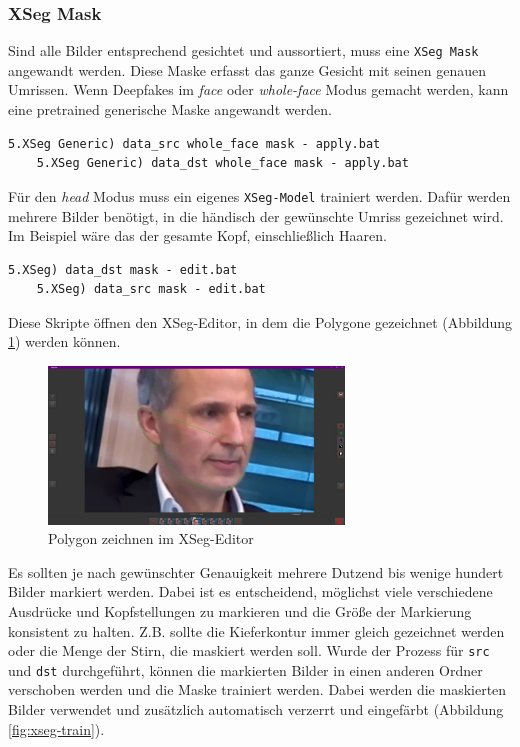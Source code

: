 \subsubsection{XSeg Mask}
Sind alle Bilder entsprechend gesichtet und aussortiert, muss eine \texttt{XSeg Mask} angewandt werden.
Diese Maske erfasst das ganze Gesicht mit seinen genauen Umrissen.
Wenn Deepfakes im \textit{face} oder \textit{whole-face} Modus gemacht werden, kann eine pretrained generische Maske angewandt werden.
\begin{lstlisting}[label={lst:extraction-5},numbers=none]
    5.XSeg Generic) data_src whole_face mask - apply.bat
    5.XSeg Generic) data_dst whole_face mask - apply.bat
\end{lstlisting}
Für den \textit{head} Modus muss ein eigenes \texttt{XSeg-Model} trainiert werden.
Dafür werden mehrere Bilder benötigt, in die händisch der gewünschte Umriss gezeichnet wird.
Im Beispiel wäre das der gesamte Kopf, einschließlich Haaren.
\begin{lstlisting}[numbers=none,label={lst:extraction-6}]
    5.XSeg) data_dst mask - edit.bat
    5.XSeg) data_src mask - edit.bat
\end{lstlisting}
Diese Skripte öffnen den XSeg-Editor, in dem die Polygone gezeichnet (Abbildung \ref{fig:xseg-editor-1}) werden können.
\begin{figure}
    \center
    \includegraphics[width=0.7\textwidth]{Bilder/DFL/XSegEditor-1-draw}
    \caption{Polygon zeichnen im XSeg-Editor}
    \label{fig:xseg-editor-1}
\end{figure}
Es sollten je nach gewünschter Genauigkeit mehrere Dutzend bis wenige hundert Bilder markiert werden.
Dabei ist es entscheidend, möglichst viele verschiedene Ausdrücke und Kopfstellungen zu markieren und die Größe der Markierung konsistent zu halten.
Z.B. sollte die Kieferkontur immer gleich gezeichnet werden oder die Menge der Stirn, die maskiert werden soll.
Wurde der Prozess für \texttt{src} und \texttt{dst} durchgeführt, können die markierten Bilder in einen anderen Ordner verschoben werden und die Maske trainiert werden. Dabei werden die maskierten Bilder verwendet und zusätzlich automatisch verzerrt und eingefärbt (Abbildung \ref{fig:xseg-train}).
